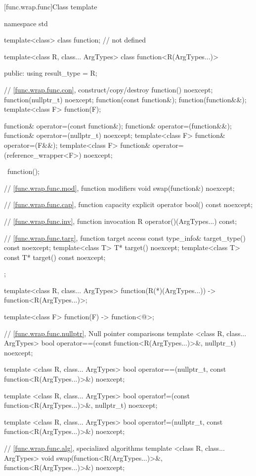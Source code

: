 [func.wrap.func]{Class template }
%

\begin{codeblock}
namespace std {
  template<class> class function; // not defined

  template<class R, class... ArgTypes>
  class function<R(ArgTypes...)> {
  public:
    using result_type = R;

    // \ref{func.wrap.func.con}, construct/copy/destroy
    function() noexcept;
    function(nullptr_t) noexcept;
    function(const function&);
    function(function&&);
    template<class F> function(F);

    function& operator=(const function&);
    function& operator=(function&&);
    function& operator=(nullptr_t) noexcept;
    template<class F> function& operator=(F&&);
    template<class F> function& operator=(reference_wrapper<F>) noexcept;

    ~function();

    // \ref{func.wrap.func.mod}, function modifiers
    void swap(function&) noexcept;

    // \ref{func.wrap.func.cap}, function capacity
    explicit operator bool() const noexcept;

    // \ref{func.wrap.func.inv}, function invocation
    R operator()(ArgTypes...) const;

    // \ref{func.wrap.func.targ}, function target access
    const type_info& target_type() const noexcept;
    template<class T>       T* target() noexcept;
    template<class T> const T* target() const noexcept;
  };

  template<class R, class... ArgTypes>
    function(R(*)(ArgTypes...)) -> function<R(ArgTypes...)>;

  template<class F> function(F) -> function<@\seebelow@>;

  // \ref{func.wrap.func.nullptr}, Null pointer comparisons
  template <class R, class... ArgTypes>
    bool operator==(const function<R(ArgTypes...)>&, nullptr_t) noexcept;

  template <class R, class... ArgTypes>
    bool operator==(nullptr_t, const function<R(ArgTypes...)>&) noexcept;

  template <class R, class... ArgTypes>
    bool operator!=(const function<R(ArgTypes...)>&, nullptr_t) noexcept;

  template <class R, class... ArgTypes>
    bool operator!=(nullptr_t, const function<R(ArgTypes...)>&) noexcept;

  // \ref{func.wrap.func.alg}, specialized algorithms
  template <class R, class... ArgTypes>
    void swap(function<R(ArgTypes...)>&, function<R(ArgTypes...)>&) noexcept;
}
\end{codeblock}

